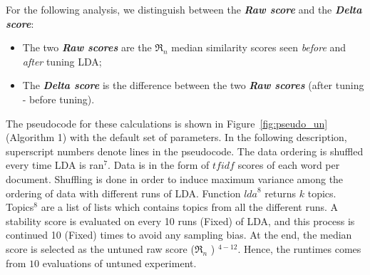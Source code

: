 \documentclass[twocolumn,5p,sort&compress]{elsarticle}
\renewcommand{\algorithmicrequire}{\textbf{Input:}}
\renewcommand{\algorithmicensure}{\textbf{Output:}}
\newcommand{\fig}[1]{Figure~\ref{fig:#1}}
\newcommand{\bi}{\begin{itemize}}
\newcommand{\ei}{\end{itemize}}
\theoremstyle{break}
\begin{document}
 For the following analysis,
we distinguish between the \textbf{\textit{Raw  score}} and the \textbf{\textit{Delta  score}}:
 \bi
\item The two \textbf{\textit{Raw  scores}} are the $\Re_n$ median similarity scores seen {\em before} and {\em after} tuning LDA;
\item The \textbf{\textit{Delta score}} is the difference between the two
  \textbf{\textit{Raw scores}} (after tuning - before tuning).  \ei 
  The pseudocode for these calculations
  is shown in \fig{pseudo_un} (Algorithm 1) with the default set of parameters. In the following
  description, superscript numbers denote lines in the pseudocode. The data ordering is
  shuffled every time LDA is ran$^{7}$. Data is in the form of $\mathit{tfidf}$
  scores of each word per document. Shuffling is done in order to induce maximum
  variance among the ordering of data with  different runs of LDA. Function $\mathit{lda}^{8}$ returns $k$ topics. Topics$^{8}$ are a list of lists which
  contains topics from all the different runs. A stability score is evaluated on
  every 10 runs (Fixed) of LDA, and this process is continued 10 (Fixed) times to avoid any sampling bias. At the end, the median
  score is selected as the untuned raw score ($\Re_n$ ) $^{4-12}$. Hence, the runtimes comes from $10$ evaluations of untuned experiment.

    
\end{document}
